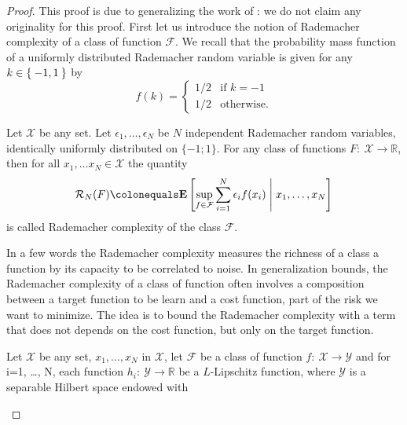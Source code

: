 \begin{proof}
    This proof is due to \citet{maurer2016vector} generalizing the work of
    \citet[section 4.3]{bartlett2002rademacher}: we do not claim any
    originality for this proof. First let us introduce the notion of Rademacher
    complexity of a class of function $\mathcal{F}$. We recall that the
    probability mass function of a uniformly distributed Rademacher random
    variable is given for any $k\in\Set{-1,1}$ by
    \begin{dmath*}
        f(k)=
        \begin{cases}
            1/2 & \text{if $k=-1$} \\
            1/2 & \text{otherwise.}
        \end{cases}
    \end{dmath*}
    \begin{definition}
        Let $\mathcal{X}$ be any set. Let $\epsilon_1,\hdots,\epsilon_N$ be $N$
        independent Rademacher random variables, identically uniformly
        distributed on $\{-1;1\}$. For any class of functions
        $F:~\mathcal{X}\to\mathbb{R}$, then for all $x_1, \hdots x_N\in
        \mathcal{X}$ the quantity
        \begin{dmath*}
            \mathcal{R}_N(F) \colonequals \expectation\left[ \sup_{f\in
            \mathcal{F}} \sum_{i=1}^N \epsilon_i f(x_i) \;\middle|\; x_1,
            \dots, x_N \right]
        \end{dmath*}
        is called Rademacher complexity of the class $\mathcal{F}$.
    \end{definition}
    In a few words the Rademacher complexity measures the richness of a class a
    function by its capacity to be correlated to noise. In generalization
    bounds, the Rademacher complexity of a class of function often involves a
    composition between a target function to be learn and a cost function, part
    of the risk we want to minimize. The idea is to bound the Rademacher
    complexity with a term that does not depends on the cost function, but only
    on the target function.
    \begin{proposition}
        \label{pr:radswap}
        Let $\mathcal{X}$ be any set, $x_1, \hdots, x_N$ in $\mathcal{X}$, let
        $\mathcal{F}$ be a class of function $f:~\mathcal{X}\to\mathcal{Y}$ and for i=1, \ldots, N, 
        each function $h_i:~\mathcal{Y}\to\mathbb{R}$ be a $L$-Lipschitz function, where
        $\mathcal{Y}$ is a separable Hilbert space endowed with

\end{proposition}
\end{proof}
